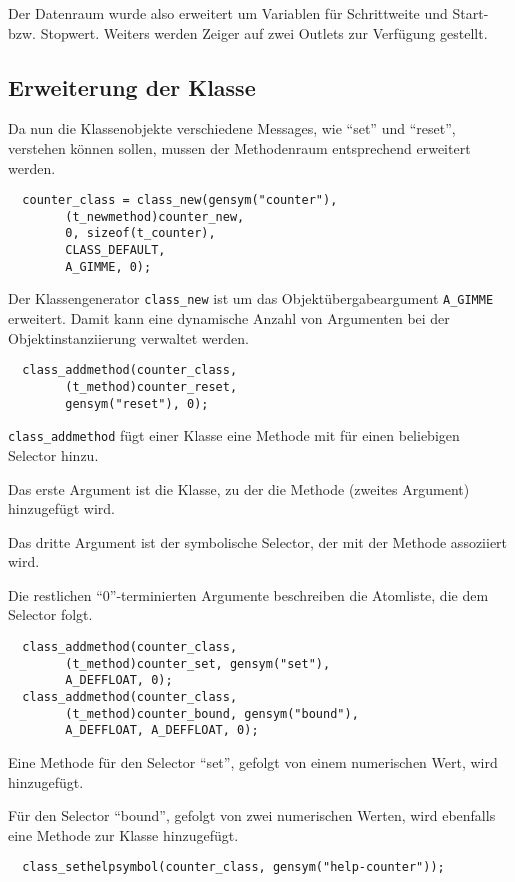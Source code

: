 \documentclass[12pt, a4paper,austrian, titlepage]{article}
\begin{document}
Der Datenraum wurde also erweitert um Variablen für Schrittweite und Start- bzw. Stopwert.
Weiters werden Zeiger auf zwei Outlets zur Verfügung gestellt.

\subsection{Erweiterung der Klasse}
Da nun die Klassenobjekte verschiedene Messages, wie ``set'' und ``reset'',
verstehen können sollen, mussen der Methodenraum entsprechend erweitert werden.

\begin{verbatim}
  counter_class = class_new(gensym("counter"),
        (t_newmethod)counter_new,
        0, sizeof(t_counter),
        CLASS_DEFAULT, 
        A_GIMME, 0);
\end{verbatim}

Der Klassengenerator \verb+class_new+ ist um das Objektübergabeargument
\verb+A_GIMME+ erweitert.
Damit kann eine dynamische Anzahl von Argumenten bei der Objektinstanziierung
verwaltet werden.

\begin{verbatim}
  class_addmethod(counter_class,
        (t_method)counter_reset,
        gensym("reset"), 0);
\end{verbatim}

\verb+class_addmethod+ fügt einer Klasse eine Methode mit für einen
beliebigen Selector hinzu.

Das erste Argument ist die Klasse,
zu der die Methode (zweites Argument) hinzugefügt wird.

Das dritte Argument ist der symbolische Selector,
der mit der Methode assoziiert wird.

Die restlichen ``0''-terminierten Argumente
beschreiben die Atomliste, die dem Selector folgt.

\begin{verbatim}
  class_addmethod(counter_class,
        (t_method)counter_set, gensym("set"),
        A_DEFFLOAT, 0);
  class_addmethod(counter_class,
        (t_method)counter_bound, gensym("bound"),
        A_DEFFLOAT, A_DEFFLOAT, 0);
\end{verbatim}

Eine Methode für den Selector ``set'', gefolgt von einem numerischen Wert,
wird hinzugefügt.

Für den Selector ``bound'', gefolgt von zwei numerischen Werten,
wird ebenfalls eine Methode zur Klasse hinzugefügt.

\begin{verbatim}
  class_sethelpsymbol(counter_class, gensym("help-counter"));
\end{verbatim}
\end{document}
